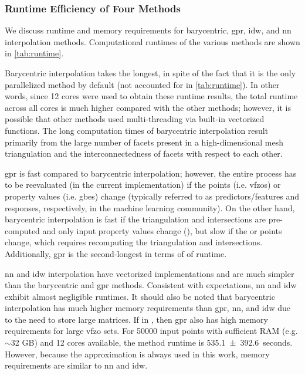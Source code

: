 \documentclass[final,twocolumn,12pt]{elsarticle}
\begin{document}
\subsubsection{Runtime Efficiency of Four Methods}
\label{sec:results:efficiency:methods}

We discuss runtime and memory requirements for barycentric, \gls{gpr}, \gls{idw}, and \gls{nn} interpolation methods. Computational runtimes of the various methods are shown in \cref{tab:runtime}.

Barycentric interpolation takes the longest, in spite of the fact that it is the only parallelized method by default (not accounted for in \cref{tab:runtime}). In other words, since 12 cores were used to obtain these runtime results, the total runtime across all cores is much higher compared with the other methods; however, it is possible that other methods used multi-threading via built-in vectorized functions. The long computation times of barycentric interpolation result primarily from the large number of facets present in a high-dimensional mesh triangulation and the interconnectedness of facets with respect to each other.

\Gls{gpr} is fast compared to barycentric interpolation; however, the entire process has to be reevaluated (in the current implementation) if the \inpt{} points (i.e. \glspl{vfzo}) or \inpt{} property values (i.e. \glspl{gbe}) change
(typically referred to as predictors/features and responses, respectively, in the machine learning community).
On the other hand, barycentric interpolation is fast if the triangulation and intersections are pre-computed and only input property values change (), but slow if the \inpt{} or \outpt{} points change, which requires recomputing the triangulation and intersections. Additionally, \gls{gpr} is the second-longest in terms of of runtime. %

\Gls{nn} and \gls{idw} interpolation have vectorized implementations and are much simpler than the barycentric and \gls{gpr} methods. Consistent with expectations, \gls{nn} and \gls{idw} exhibit almost negligible runtimes. %
It should also be noted that barycentric interpolation has much higher memory requirements than \gls{gpr}, \gls{nn}, and \gls{idw} due to the need to store large matrices. If  in , then \gls{gpr} also has high memory requirements for large \gls{vfzo} sets. For \num{50000} input points with sufficient RAM (e.g. $\sim$32 GB) and 12 cores available, the  method runtime is \SI{535.1 \pm 392.6}{seconds}. However, because the  approximation is always used in this work, memory requirements are similar to \gls{nn} and \gls{idw}.
\end{document}
